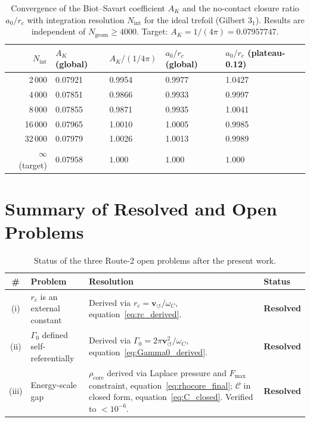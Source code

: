 \documentclass[11pt,a4paper]{article}
\newcommand{\rc}{r_c}
\newcommand{\vswirl}{\mathbf{v}_{\scriptscriptstyle\boldsymbol{\circlearrowleft}}}
\newcommand{\rhocore}{\rho_{\!\mathrm{core}}}
\newcommand{\GammaZ}{\Gamma_0}
\newcommand{\omC}{\omega_C}
\begin{document}
\begin{table}[h]
\centering
\caption{Convergence of the Biot--Savart coefficient $A_K$ and the
  no-contact closure ratio $a_0/\rc$ with integration resolution
  $N_{\mathrm{int}}$ for the ideal trefoil (Gilbert $3_1$).
  Results are independent of $N_{\mathrm{geom}}\geq4000$.
  Target: $A_K=1/(4\pi)=0.07957747$.}
\label{tab:convergence}
\begin{tabular}{rllll}
  \toprule
  $N_{\mathrm{int}}$ & $A_K$ (global) & $A_K/(1/4\pi)$ & $a_0/\rc$ (global) & $a_0/\rc$ (plateau-0.12) \\
  \midrule
   2\,000 & 0.07921 & 0.9954 & 0.9977 & 1.0427 \\
   4\,000 & 0.07851 & 0.9866 & 0.9933 & 0.9997 \\
   8\,000 & 0.07855 & 0.9871 & 0.9935 & 1.0041 \\
  16\,000 & 0.07965 & 1.0010 & 1.0005 & 0.9985 \\
  32\,000 & 0.07979 & 1.0026 & 1.0013 & 0.9989 \\
  \midrule
  $\infty$ (target) & $0.07958$ & $1.000$ & $1.000$ & $1.000$ \\
  \bottomrule
\end{tabular}
\end{table}

\section{Summary of Resolved and Open Problems}

\begin{table}[h]
\centering
\caption{Status of the three Route-2 open problems after the present work.}
\label{tab:status}
\begin{tabular}{clp{7.5cm}l}
  \toprule
  \# & Problem & Resolution & Status \\
  \midrule
  (i)  & $\rc$ is an external constant
       & Derived via $\rc=\vswirl/\omC$,
         equation~\eqref{eq:rc_derived}.
       & \textbf{Resolved} \\[4pt]
  (ii) & $\GammaZ$ defined self-referentially
       & Derived via $\GammaZ=2\pi\vswirl^2/\omC$,
         equation~\eqref{eq:Gamma0_derived}.
       & \textbf{Resolved} \\[4pt]
  (iii)& Energy-scale gap
       & $\rhocore$ derived via Laplace pressure
         and $F_{\max}$ constraint,
         equation~\eqref{eq:rhocore_final};
         $\mathcal{C}$ in closed form,
         equation~\eqref{eq:C_closed}.
         Verified to $<10^{-6}$.
       & \textbf{Resolved} \\
  \bottomrule
\end{tabular}
\end{table}
\end{document}

